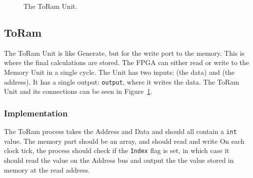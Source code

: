 \begin{figure}
    \centering
    \caption{The ToRam Unit.}
    \label{fig:mem}
\end{figure}


\subsection{ToRam}
The ToRam Unit is like Generate, but for the write port to the memory. This is where the final calculations are stored. The FPGA can either read or write to the Memory
Unit in a single cycle. The Unit has two inputs:  (the data) and  (the address).
It has a single output: \texttt{output}, where it writes the data. The ToRam Unit and its connections can be
seen in Figure~\ref{fig:mem}.

\subsubsection*{Implementation}
The ToRam process takes the Address and Data and should all contain a \texttt{int} value. 
The memory part should be an array, and
should read and write 
On each clock tick, the process should check if the \texttt{Index} flag is
set, in which case it should read the value on the Address bus and output the
the value stored in memory at the read address. 





